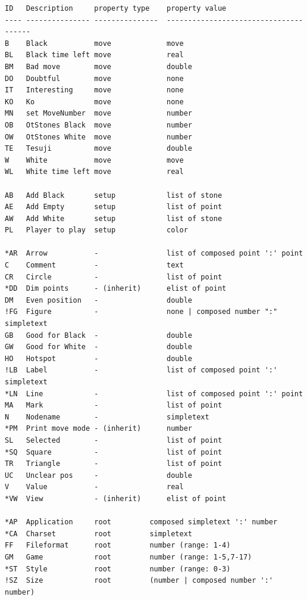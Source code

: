 \begin{verbatim}
ID   Description     property type    property value
---- --------------- ---------------  --------------------------------------
B    Black           move             move
BL   Black time left move             real
BM   Bad move        move             double
DO   Doubtful        move             none
IT   Interesting     move             none
KO   Ko              move             none
MN   set MoveNumber  move             number
OB   OtStones Black  move             number
OW   OtStones White  move             number
TE   Tesuji          move             double
W    White           move             move
WL   White time left move             real

AB   Add Black       setup            list of stone
AE   Add Empty       setup            list of point
AW   Add White       setup            list of stone
PL   Player to play  setup            color

*AR  Arrow           -                list of composed point ':' point
C    Comment         -                text
CR   Circle          -                list of point
*DD  Dim points      - (inherit)      elist of point
DM   Even position   -                double
!FG  Figure          -                none | composed number ":" simpletext
GB   Good for Black  -                double
GW   Good for White  -                double
HO   Hotspot         -                double
!LB  Label           -                list of composed point ':' simpletext
*LN  Line            -                list of composed point ':' point
MA   Mark            -                list of point
N    Nodename        -                simpletext
*PM  Print move mode - (inherit)      number
SL   Selected        -                list of point
*SQ  Square          -                list of point
TR   Triangle        -                list of point
UC   Unclear pos     -                double
V    Value           -                real
*VW  View            - (inherit)      elist of point

*AP  Application     root         composed simpletext ':' number
*CA  Charset         root         simpletext
FF   Fileformat      root         number (range: 1-4)
GM   Game            root         number (range: 1-5,7-17)
*ST  Style           root         number (range: 0-3)
!SZ  Size            root         (number | composed number ':' number)


\end{verbatim}
